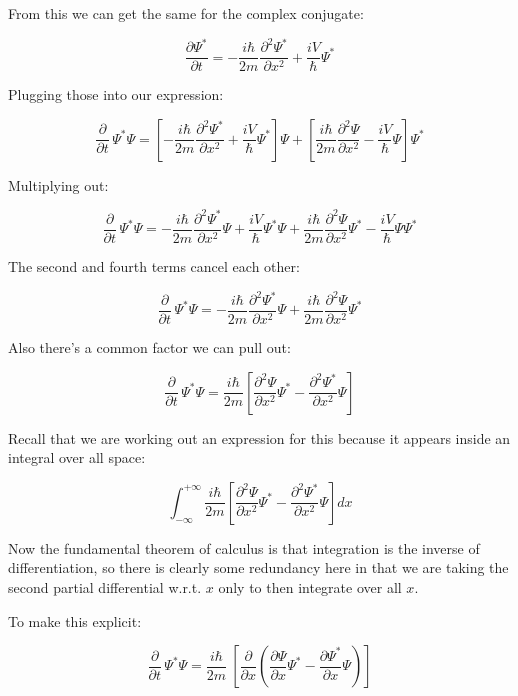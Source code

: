 From this we can get the same for the complex conjugate:

$$
\frac{\partial \Psi^*}{\partial t}
=
- \frac{i \hbar}{2m} \frac{\partial^2 \Psi^*}{\partial x^2}
+ \frac{i V}{\hbar}{\Psi^*}
$$

Plugging those into our expression:

$$
\frac{\partial}{\partial t} \, \Psi^*\Psi
=
\left[
- \frac{i \hbar}{2m} \frac{\partial^2 \Psi^*}{\partial x^2}
+ \frac{i V}{\hbar}\Psi^*
\right] \Psi
+
\left[
\frac{i \hbar}{2m} \frac{\partial^2 \Psi}{\partial x^2}
- \frac{i V}{\hbar}\Psi
\right] \Psi^*
$$

Multiplying out:

$$
\frac{\partial}{\partial t} \, \Psi^*\Psi
=
- \frac{i \hbar}{2m} \frac{\partial^2 \Psi^*}{\partial x^2}
\Psi
+ \frac{i V}{\hbar}\Psi^*\Psi
+
\frac{i \hbar}{2m} \frac{\partial^2 \Psi}{\partial x^2}
\Psi^*
- \frac{i V}{\hbar}\Psi\Psi^*
$$

The second and fourth terms cancel each other:

$$
\frac{\partial}{\partial t} \, \Psi^*\Psi
=
- \frac{i \hbar}{2m} \frac{\partial^2 \Psi^*}{\partial x^2}
\Psi
+
\frac{i \hbar}{2m} \frac{\partial^2 \Psi}{\partial x^2}
\Psi^*
$$

Also there's a common factor we can pull out:

$$
\frac{\partial}{\partial t} \, \Psi^*\Psi
=
\frac{i \hbar}{2m}
\left[
\frac{\partial^2 \Psi}{\partial x^2}\Psi^*
- \frac{\partial^2 \Psi^*}{\partial x^2}\Psi
\right]
$$

Recall that we are working out an expression for this because it appears inside an integral over all space:

$$
\int_{-\infty}^{+\infty}
\frac{i \hbar}{2m}
\left[
\frac{\partial^2 \Psi}{\partial x^2}\Psi^*
- \frac{\partial^2 \Psi^*}{\partial x^2}\Psi
\right]
dx
$$

Now the fundamental theorem of calculus is that integration is the inverse of differentiation, so there is clearly some redundancy here in that we are taking the second partial differential w.r.t. $x$ only to then integrate over all $x$.

To make this explicit:

\begin{equation}  
\frac{\partial}{\partial t} \, \Psi^*\Psi
=
\frac{i \hbar}{2m} \
\left[
\frac{\partial}{\partial x}
\left(
\frac{\partial \Psi}{\partial x}\Psi^*
- \frac{\partial \Psi^*}{\partial x}\Psi
\right)
\right]
\label{eqn:qm-byparts}
\end{equation}

